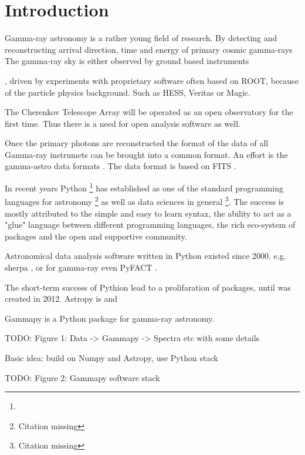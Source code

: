 \section{Introduction}
\label{sec:intro}


Gamma-ray astronomy is a rather young field of research.
By detecting and reconstructing arrival direction, time and energy
of primary cosmic gamma-rays
The gamma-ray sky is either observed by ground based instruments

, driven by experiments with proprietary software often based
on ROOT, because of the particle physics background. Such
as HESS, Veritas or Magic.

The Cherenkov Telescope Array will be operated as an open
observatory for the first time. Thus there is a need for
open analysis software as well.

Once the primary photons are reconstructed the format of the data
of all Gamma-ray instrumets can be brought into a common format.
An effort is the gamma-astro data formats \cite{gadf-zenodo}.
The data format is based on FITS  \citep{fits}.


In recent years Python \footnote{\PythonUrl} has established as one of the
standard programming  languages for astronomy \footnote{Citation missing}
as well as data sciences in  general \footnote{Citation missing}.
The success is mostly attributed to the simple and easy to learn syntax,
the ability to act as a "glue" language between different programming
languages, the rich eco-system of packages and the open and supportive
community.

Astronomical data analysis software written in Python existed since 2000.
e.g. sherpa \citep{sherpa-2011, sherpa-2009}, or for gamma-ray even
PyFACT \citep{pyfact}.

The short-term success of Pythion lead to a prolifaration of packages, until
\astropy \citep{astropy} was created in 2012. Astropy is and


Gammapy is a Python package for gamma-ray astronomy.



TODO: Figure 1: Data -> Gammapy -> Spectra etc with some details

Basic idea: build on Numpy and Astropy, use Python stack

TODO: Figure 2: Gammapy software stack

